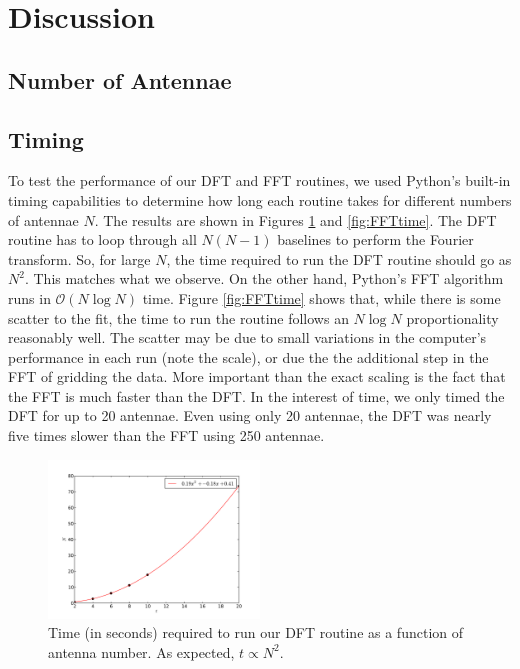 \documentclass[11pt,letterpaper]{article}
\begin{document}
\section{Discussion}
\subsection{Number of Antennae}

\subsection{Timing}
To test the performance of our DFT and FFT routines, we used Python's built-in 
timing capabilities to determine how long each routine takes for different 
numbers of antennae $N$.  The results are shown in Figures \ref{fig:DFTtime} and 
\ref{fig:FFTtime}.  The DFT routine has to loop through all $N(N-1)$ baselines 
to perform the Fourier transform.  So, for large $N$, the time required to 
run the DFT routine should go as $N^2$.  This matches what we observe.  On the 
other hand, Python's FFT algorithm runs in $\mathcal{O}(N\log N)$ time.  Figure 
\ref{fig:FFTtime} shows that, while there is some scatter to the fit, the time 
to run the routine follows an $N\log N$ proportionality reasonably well.  
The scatter may be due to small variations in the computer's performance in 
each run (note the scale), or due the the additional step in the FFT of 
gridding the data.  More important than the exact scaling is the fact that 
the FFT is much faster than the DFT.  In the interest of time, we only timed 
the DFT for up to 20 antennae.  Even using only 20 antennae, the DFT was nearly 
five times slower than the FFT using 250 antennae.

\begin{figure}[!h]
\centering
\includegraphics[width=0.5\textwidth]{DFT_image_timing.pdf}
\caption{Time (in seconds) required to run our DFT routine as a function of 
antenna number.  As expected, $t\propto N^2$.}
\label{fig:DFTtime}
\end{figure}
\end{document}
